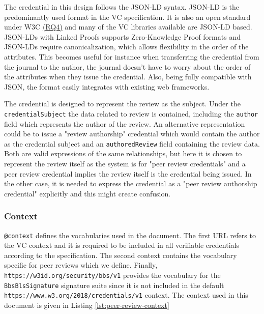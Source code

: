 The credential in this design follows the \acrshort{JSON-LD} syntax. \acrshort{JSON-LD} is the predominantly used format in the \acrshort{VC} specification. It is also an open standard under W3C \parencite{jsonld} \hyperref[rq:open-standards]{(RQ4)} and many of the \acrshort{VC} libraries available are \acrshort{JSON-LD} based.  \acrshort{JSON-LD}s with Linked Proofs supports Zero-Knowledge Proof formats and \acrshort{JSON-LD}s require canonicalization, which allows flexibility in the order of the attributes. This becomes useful for instance when transferring the credential from the journal to the author, the journal doesn't have to worry about the order of the attributes when they issue the credential. Also, being fully compatible with \acrshort{JSON}, the format easily integrates with existing web frameworks. 

The credential is designed to represent the review as the subject. Under the \lstinline{credentialSubject} the data related to review is contained, including the \lstinline{author} field which represents the author of the review. An alternative representation could be to issue a "review authorship" credential which would contain the author as the credential subject and an \lstinline{authoredReview} field containing the review data. Both are valid expressions of the same relationships, but here it is chosen to represent the review itself as the system is for "peer review credentials" and a peer review credential implies the review itself is the credential being issued. In the other case, it is needed to express the credential as a "peer review authorship credential" explicitly and this might create confusion.

\subsubsection{Context}

\lstinline{@context} defines the vocabularies used in the document. The first \acrshort{URL} refers to the \acrshort{VC} context and it is required to be included in all verifiable credentials according to the specification. The second context contains the vocabulary specific for peer reviews which we define. Finally, \lstinline{https://w3id.org/security/bbs/v1} provides the vocabulary for the \lstinline{BbsBlsSignature} signature suite since it is not included in the default \lstinline{https://www.w3.org/2018/credentials/v1} context. The context used in this document is given in Listing \ref{lst:peer-review-context}

